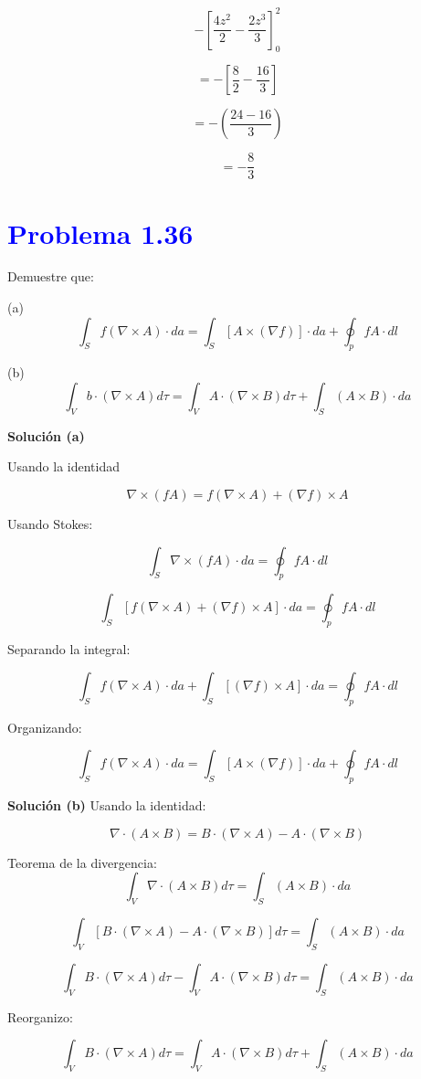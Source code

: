 \documentclass[12pt]{article}
\newcommand{\question}[1]{\textcolor{blue}{\textbf{#1}}}
\begin{document}
\[
-\left[ \frac{4z^2}{2} - \frac{2z^3}{3} \right]_0^2
\]

\[
=-\left[ \frac{8}{2} - \frac{16}{3} \right]
\]

\[
=-\left( \frac{24 - 16}{3} \right)
\]

\[
\boxed{ =-\frac{8}{3}}
\]
\section*{\question{Problema  1.36}} Demuestre que:

(a) 
\[
\int_S f (\nabla \times A) \cdot da = \int_S [ A \times (\nabla f)] \cdot da + \oint_p f A \cdot dl
\]

(b) 
\[
\int_V b \cdot (\nabla \times A) d\tau = \int_V A \cdot (\nabla \times B) d\tau + \int_S (A \times B) \cdot da
\]

\textbf{Solución (a)}

Usando la identidad

\[
\nabla \times (f A) = f (\nabla \times A) + (\nabla f) \times A
\]

Usando Stokes:

\[
\int_S \nabla \times (f A) \cdot da = \oint_p f A \cdot dl
\]

\[
\int_S [ f (\nabla \times A) + (\nabla f) \times A ] \cdot da = \oint_p f A \cdot dl
\]

Separando la integral:

\[
\int_S f (\nabla \times A) \cdot da + \int_S [ (\nabla f) \times A ] \cdot da = \oint_p f A \cdot dl
\]

Organizando:

\[
\int_S f (\nabla \times A) \cdot da = \int_S [ A \times (\nabla f)] \cdot da + \oint_p f A \cdot dl
\]

\textbf{Solución (b)}
Usando la identidad:

\[
\nabla \cdot ( A \times B ) = B \cdot (\nabla \times A) - A \cdot (\nabla \times B)
\]

Teorema de la divergencia:
\[
\int_V \nabla \cdot (A \times B) d\tau = \int_S (A \times B) \cdot da
\]

\[
\int_V \left[ B \cdot (\nabla \times A) - A \cdot (\nabla \times B) \right] d\tau = \int_S (A \times B) \cdot da
\]

\[
\int_V B \cdot (\nabla \times A) d\tau - \int_V A \cdot (\nabla \times B) d\tau = \int_S (A \times B) \cdot da
\]

Reorganizo:

\[
\int_V B \cdot (\nabla \times A) d\tau = \int_V A \cdot (\nabla \times B) d\tau + \int_S (A \times B) \cdot da
\]
\end{document}
